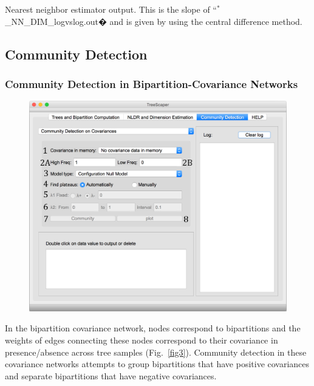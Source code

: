 \documentclass[11pt]{article}
\begin{document}
\begin{sloppypar} Nearest neighbor estimator output. This is the slope of ``$^{*}$\_NN\_DIM\_logvslog.out� and is given by using the central difference method. \\ \end{sloppypar}

\newpage
\subsection{Community Detection}\label{subsect:CommunityDetectionMenu}


\subsubsection{Community Detection in Bipartition-Covariance Networks}\label{subsubsect:CommunityDetectionBipartCovMenu}


\begin{figure}[thbp!]\centering
\includegraphics[scale=0.4]{imagesForManual/image_9.png}
\end{figure}

In the bipartition covariance network, nodes correspond to bipartitions and the weights of
edges connecting these nodes correspond to their covariance in presence/absence across tree
samples (Fig.~\ref{fig3}). Community detection in these covariance networks attempts to group
bipartitions that have positive covariances and separate bipartitions that have negative
covariances. \\
\end{document}
